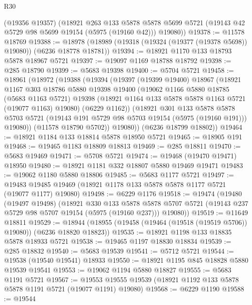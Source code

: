 \begin{lexlean}{R30}
\begin{coremodule}
      (@19356 @19357)
      (@18921
        @263
        @133
        @5878
        @5878
        @5699
        @5721
        (@19143 @42 @5729 @98 @5699 @19154 (@5975 (@19160 @42)))
        @19080))
@19378 := @11578 @18769
@19388 := @18978 (@18989 (@19318 (@19324 (@19377 (@19378 @5698)) @19080)) (@6236 @18778 @18781))
@19394 := @18921 @1170 @133 @18793 @5878 @18967 @5721
@19397 := @19097 @1169 @18788 @18792
@19398 := @285 @18790
@19399 := @5683 @19398
@19400 := @5704 @5721
@19458 := @18961
    (@18972
      (@19388
        (@19394
          (@19397
            (@19399 @19400)
            @18967
            (@18921
              @1167
              @303
              @18786
              @5880
              @19398
              @19400
              (@19062
                @1166
                @5880
                @18785
                (@5683 @1163 @5721)
                @19398
                (@18921 @1164 @133 @5878 @5878 @1163 @5721 (@19077 @1163) @19080)
                (@6229 @1162))
              (@18921
                @301
                @133
                @5878
                @5878
                @5703
                @5721
                (@19143 @191 @5729 @98 @5703 @19154 (@5975 (@19160 @191)))
                @19080))
            (@11578 @18790 @5702))
          @19080))
      (@6236 @18799 @18802))
@19464 := @18921 @1184 @133 @18814 @5878 @18950 @5721
@19465 := @18905 @191
@19468 := @19465 @1183 @18809 @18813
@19469 := @285 @18811
@19470 := @5683 @19469
@19471 := @5708 @5721
@19474 := @19468 (@19470 @19471) @18950
@19480 := @18921 @1181 @332 @18807 @5880 @19469 @19471
@19483 := @19062 @1180 @5880 @18806
@19485 := @5683 @1177 @5721
@19497 := @19483 @19485 @19469 (@18921 @1178 @133 @5878 @5878 @1177 @5721 (@19077 @1177) @19080)
@19498 := @6229 @1176
@19518 := @19474
    (@19480
      (@19497 @19498)
      (@18921
        @330
        @133
        @5878
        @5878
        @5707
        @5721
        (@19143 @237 @5729 @98 @5707 @19154 (@5975 (@19160 @237)))
        @19080))
@19519 := @11649 @18811
@19529 := @18944 (@18955 (@19458 (@19464 (@19518 (@19519 @5706)) @19080)) (@6236 @18820 @18823))
@19535 := @18921 @1198 @133 @18835 @5878 @18933 @5721
@19538 := @19465 @1197 @18830 @18834
@19539 := @285 @18832
@19540 := @5683 @19539
@19541 := @5712 @5721
@19544 := @19538 (@19540 @19541) @18933
@19550 := @18921 @1195 @845 @18828 @5880 @19539 @19541
@19553 := @19062 @1194 @5880 @18827
@19555 := @5683 @1191 @5721
@19567 := @19553 @19555 @19539 (@18921 @1192 @133 @5878 @5878 @1191 @5721 (@19077 @1191) @19080)
@19568 := @6229 @1190
@19588 := @19544

\end{coremodule}
\end{lexlean}
